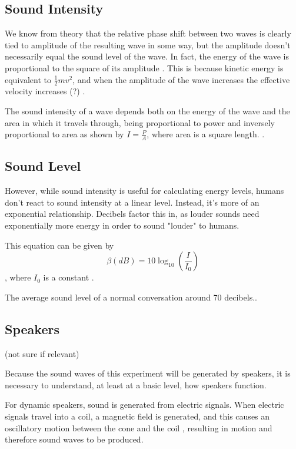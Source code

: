 \documentclass[index]{subfiles}
\begin{document}
\subsection{Sound Intensity}

We know from theory that the relative phase shift between two waves is clearly tied to amplitude of the resulting wave in some way, but the amplitude doesn't necessarily equal the sound level of the wave. In fact, the energy of the wave is proportional to the square of its amplitude \cite{openstax}. This is because kinetic energy is equivalent to \(\frac{1}{2}mv^{2}\), and when the amplitude of the wave increases the effective velocity increases (?) \cite{openstax}.

The sound intensity of a wave depends both on the energy of the wave and the area in which it travels through, being proportional to power and inversely proportional to area as shown by \(I=\frac{P}{A}\), where area is a square length. \cite{openstax}.

\subsection{Sound Level}

However, while sound intensity is useful for calculating energy levels, humans don't react to sound intensity at a linear level. Instead, it's more of an exponential relationship. Decibels factor this in, as louder sounds need exponentially more energy in order to sound "louder" to humans.

This equation can be given by
$$
    \beta\left(dB\right)=10\log_{10}\left(\frac{I}{I_{0}}\right)
$$, where \(I_{0}\) is a constant \cite{openstax}.

The average sound level of a normal conversation around 70 decibels.\cite{speakers}.

\subsection{Speakers} (not sure if relevant)

Because the sound waves of this experiment will be generated by speakers, it is necessary to understand, at least at a basic level, how speakers function. \cite{speakers}

For dynamic speakers, sound is generated from electric signals. When electric signals travel into a coil, a magnetic field is generated, and this causes an oscillatory motion between the cone and the coil \cite{openstax} \cite{speakers}, resulting in motion and therefore sound waves to be produced.
\end{document}
